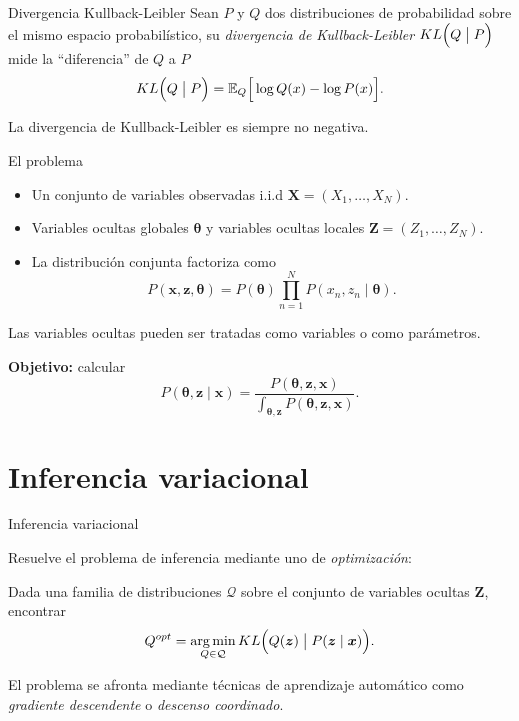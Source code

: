 \documentclass[aspectratio=169]{beamer}
\newcommand{\bx}{\bm{x}}
\newcommand{\bX}{\bm{X}}
\newcommand{\bz}{\bm{z}}
\newcommand{\bZ}{\bm{Z}}
\newcommand{\btheta}{\bm{\theta}}
\DeclareMathOperator*{\argmin}{arg\,min}
\newcommand\E[2]{\mathbb{E}_{#1}\Big[#2\Big]}
\newcommand\KL[2]{KL\Big(#1 \bigm| #2\Big)}
\begin{document}
    \begin{frame}{Divergencia Kullback-Leibler}
    Sean \(P\) y \(Q\) dos distribuciones de probabilidad sobre el mismo espacio probabilístico, su \emph{divergencia de Kullback-Leibler} \(\KL{Q}{P}\) mide la ``diferencia'' de \(Q\) a \(P\)
    \[
      \KL{Q}{P} = \E{Q}{\log Q(x) - \log P(x)}.
    \]
    \begin{shaded}
      La divergencia de Kullback-Leibler es siempre no negativa.
    \end{shaded}
  \end{frame}

  \begin{frame}{El problema}
    \begin{itemize}
      \item Un conjunto de variables observadas i.i.d \(\bX = (X_{1},\dots,X_{N})\).
      \item Variables ocultas globales \(\btheta\) y variables ocultas locales \(\bZ = (Z_{1},\dots,Z_{N})\).
      \item La distribución conjunta factoriza como
        \[
        P(\bx, \bz, \btheta) = P(\btheta)\prod_{n=1}^{N}P(x_{n}, z_{n} \mid \btheta).
        \]
    \end{itemize}
    \begin{shaded}
      Las variables ocultas pueden ser tratadas como variables o como parámetros.
    \end{shaded}
    \textbf{Objetivo:} calcular
    \[
      P(\btheta, \bz \mid \bx) = \frac{P(\btheta, \bz, \bx)}{\int_{\btheta, \bz}P(\btheta, \bz, \bx)}.
    \]
  \end{frame}


  \section{Inferencia variacional}
  \begin{frame}{Inferencia variacional}

    Resuelve el problema de inferencia mediante uno de \emph{optimización}:
    \begin{shaded}
      Dada una familia de distribuciones \(\mathcal{Q}\) sobre el conjunto de variables ocultas \(\bZ\), encontrar
      \[
        Q^{opt} = \argmin_{Q \in \mathcal{Q}} \KL{Q(\bz)}{P(\bz \mid \bx)}.
      \]
    \end{shaded}

    El problema se afronta mediante técnicas de aprendizaje automático como \emph{gradiente descendente} o \emph{descenso coordinado}.
  \end{frame}
\end{document}
